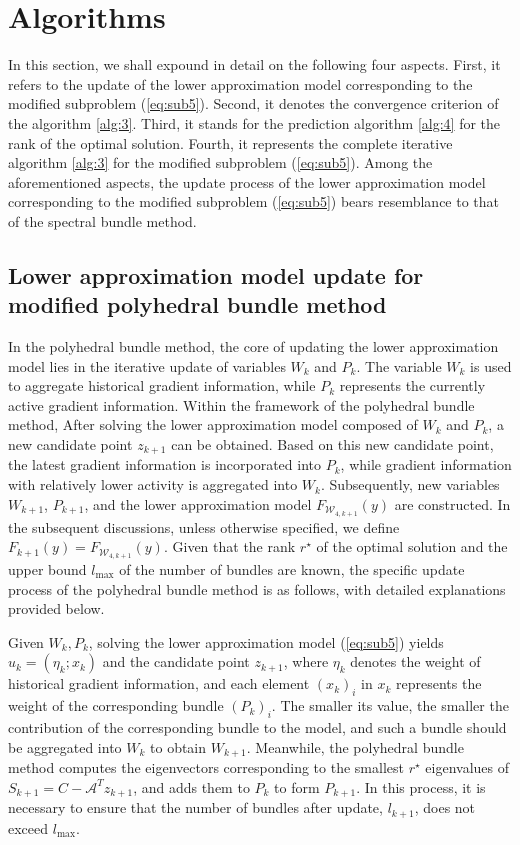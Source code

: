 \documentclass{jcmlatex}
\begin{document}
\section{Algorithms}\label{sec:3}
In this section, we shall expound in detail on the following four aspects. First, it refers to the update of the lower approximation model corresponding to the modified subproblem (\ref{eq:sub5}). Second, it denotes the convergence criterion of the algorithm \ref{alg:3}. Third, it stands for the prediction algorithm \ref{alg:4} for the rank of the optimal solution. Fourth, it represents the complete iterative algorithm \ref{alg:3} for the modified subproblem (\ref{eq:sub5}). Among the aforementioned aspects, the update process of the lower approximation model corresponding to the modified subproblem (\ref{eq:sub5}) bears resemblance to that of the spectral bundle method.
\subsection{Lower approximation model update for modified polyhedral bundle method}
In the polyhedral bundle method, the core of updating the lower approximation model lies in the iterative update of variables \(W_{k}\) and \(P_{k}\). The variable \(W_{k}\) is used to aggregate historical gradient information, while \(P_{k}\) represents the currently active gradient information. Within the framework of the polyhedral bundle method, After solving the lower approximation model composed of \(W_{k}\) and \(P_{k}\), a new candidate point \(z_{k+1}\) can be obtained. Based on this new candidate point, the latest gradient information is incorporated into \(P_{k}\), while gradient information with relatively lower activity is aggregated into \(W_{k}\). Subsequently, new variables \(W_{k+1}\), \(P_{k+1}\), and the lower approximation model \(F_{\mathcal{W}_{4,k+1}}(y)\) are constructed. In the subsequent discussions, unless otherwise specified, we define \(F_{k+1}(y) =F_{\mathcal{W}_{4,k+1}}(y)\). Given that the rank \(r^{\star}\) of the optimal solution and the upper bound \(l_{\max}\) of the number of bundles are known, the specific update process of the polyhedral bundle method is as follows, with detailed explanations provided below.
    
Given \(W_k, P_k\), solving the lower approximation model (\ref{eq:sub5}) yields \(u_k = (\eta_k; x_k)\) and the candidate point \(z_{k+1}\), where \(\eta_k\) denotes the weight of historical gradient information, and each element \((x_k)_i\) in \(x_k\) represents the weight of the corresponding bundle \((P_k)_i\). The smaller its value, the smaller the contribution of the corresponding bundle to the model, and such a bundle should be aggregated into \(W_k\) to obtain \(W_{k+1}\). Meanwhile, the polyhedral bundle method computes the eigenvectors corresponding to the smallest \(r^{\star}\) eigenvalues of \(S_{k+1}=C-\mathcal{A}^T z_{k+1}\), and adds them to \(P_k\) to form \(P_{k+1}\). In this process, it is necessary to ensure that the number of bundles after update, \(l_{k+1}\), does not exceed \(l_{\max}\).
\end{document}
